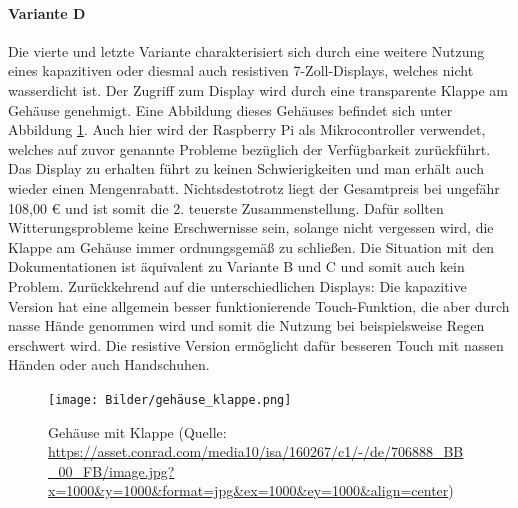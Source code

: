 \paragraph{Variante D}
Die vierte und letzte Variante charakterisiert sich durch eine weitere Nutzung eines kapazitiven oder diesmal auch resistiven 7-Zoll-Displays, welches nicht wasserdicht ist. Der Zugriff zum Display wird durch eine transparente Klappe am Gehäuse genehmigt. Eine Abbildung dieses Gehäuses befindet sich unter Abbildung \ref{fig:gehäuse_mit_klappe}. Auch hier wird der Raspberry Pi als Mikrocontroller verwendet, welches auf zuvor genannte Probleme bezüglich der Verfügbarkeit zurückführt. Das Display zu erhalten führt zu keinen Schwierigkeiten und man erhält auch wieder einen Mengenrabatt. Nichtsdestotrotz liegt der Gesamtpreis bei ungefähr 108,00 € und ist somit die 2. teuerste Zusammenstellung. Dafür sollten Witterungsprobleme keine Erschwernisse sein, solange nicht vergessen wird, die Klappe am Gehäuse immer ordnungsgemäß zu schließen. Die Situation mit den Dokumentationen ist äquivalent zu Variante B und C und somit auch kein Problem. Zurückkehrend auf die unterschiedlichen Displays: Die kapazitive Version hat eine allgemein besser funktionierende Touch-Funktion, die aber durch nasse Hände genommen wird und somit die Nutzung bei beispielsweise Regen erschwert wird. Die resistive Version ermöglicht dafür besseren Touch mit nassen Händen oder auch Handschuhen.
\begin{figure}[ht]
	\centering
	\texttt{[image: Bilder/gehäuse\_klappe.png]}
	\caption{Gehäuse mit Klappe (Quelle: \url{https://asset.conrad.com/media10/isa/160267/c1/-/de/706888_BB_00_FB/image.jpg?x=1000&y=1000&format=jpg&ex=1000&ey=1000&align=center})}
	\label{fig:gehäuse_mit_klappe}
\end{figure}
\newpage
